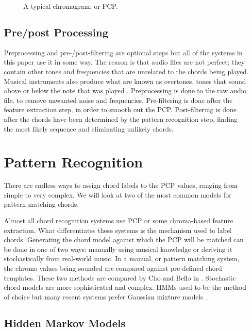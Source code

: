 \documentclass{sig-alternate}
\begin{document}
\begin{figure}
\centering
{}
\caption{A typical chromagram, or PCP.}
\label{fig:fig4}
\end{figure}

\subsection{Pre/post Processing}

Preprocessing and pre-/post-filtering are optional steps but all of the systems in this paper use it in some way. The reason is that audio files are not perfect; they contain other tones and frequencies that are unrelated to the chords being played. Musical instruments also produce what are known as overtones, tones that sound above or below the note that was played \cite{TaeMin:2014}. Preprocessing is done to the raw audio file, to remove unwanted noise and frequencies. Pre-filtering is done after the feature extraction step, in order to smooth out the PCP. Post-filtering is done after the chords have been determined by the pattern recognition step, finding the most likely sequence and eliminating unlikely chords.


\section{Pattern Recognition}

There are endless ways to assign chord labels to the PCP values, ranging from simple to very complex. We will look at two of the most common models for pattern matching chords.

Almost all chord recognition systems use PCP or some chroma-based feature extraction. What differentiates these systems is the mechanism used to label chords. Generating the chord model against which the PCP will be matched can be done in one of two ways: manually using musical knowledge or deriving it stochastically from real-world music. In a manual, or pattern matching system, the chroma values being sounded are compared against pre-defined chord templates. These two methods are compared by Cho and Bello in  \cite{TaeMin:2014}. Stochastic chord models are more sophisticated and complex. HMMs used to be the method of choice but many recent systems prefer Gaussian mixture models \cite{TaeMin:2014}.

\subsection{Hidden Markov Models}\label{main} 
\end{document}
